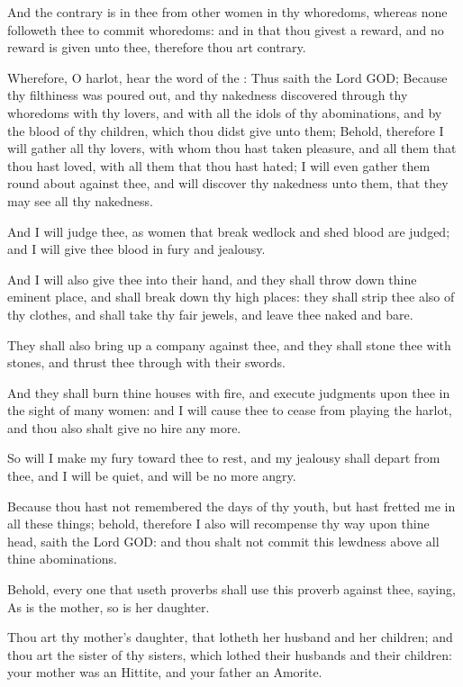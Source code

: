 \verse And the contrary is in thee from other women in thy whoredoms, whereas none followeth thee to commit whoredoms: and in that thou givest a reward, and no reward is given unto thee, therefore thou art contrary.

\verse Wherefore, O harlot, hear the word of the \LORD: \verse Thus saith the Lord GOD; Because thy filthiness was poured out, and thy nakedness discovered through thy whoredoms with thy lovers, and with all the idols of thy abominations, and by the blood of thy children, which thou didst give unto them; \verse Behold, therefore I will gather all thy lovers, with whom thou hast taken pleasure, and all them that thou hast loved, with all them that thou hast hated; I will even gather them round about against thee, and will discover thy nakedness unto them, that they may see all thy nakedness.

\verse And I will judge thee, as women that break wedlock and shed blood are judged; and I will give thee blood in fury and jealousy.

\verse And I will also give thee into their hand, and they shall throw down thine eminent place, and shall break down thy high places: they shall strip thee also of thy clothes, and shall take thy fair jewels, and leave thee naked and bare.

\verse They shall also bring up a company against thee, and they shall stone thee with stones, and thrust thee through with their swords.

\verse And they shall burn thine houses with fire, and execute judgments upon thee in the sight of many women: and I will cause thee to cease from playing the harlot, and thou also shalt give no hire any more.

\verse So will I make my fury toward thee to rest, and my jealousy shall depart from thee, and I will be quiet, and will be no more angry.

\verse Because thou hast not remembered the days of thy youth, but hast fretted me in all these things; behold, therefore I also will recompense thy way upon thine head, saith the Lord GOD: and thou shalt not commit this lewdness above all thine abominations.

\verse Behold, every one that useth proverbs shall use this proverb against thee, saying, As is the mother, so is her daughter.

\verse Thou art thy mother's daughter, that lotheth her husband and her children; and thou art the sister of thy sisters, which lothed their husbands and their children: your mother was an Hittite, and your father an Amorite.

